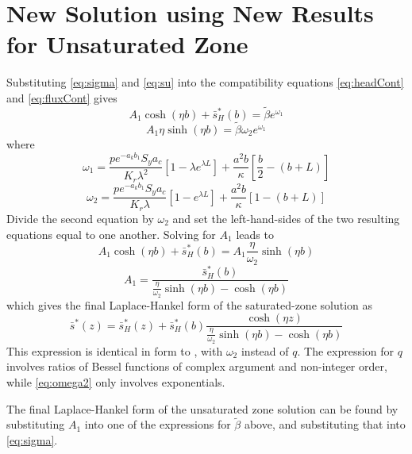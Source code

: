 \documentclass[11pt]{article}
\begin{document}
\section{New Solution using New Results for Unsaturated Zone}
Substituting \eqref{eq:sigma} and \eqref{eq:su} into the compatibility
equations \eqref{eq:headCont} and \eqref{eq:fluxCont} gives
$$  A_1 \cosh(\eta b) + \bar{s}_H^{\ast}(b) = \tilde{\beta}e^{\omega_1}$$
$$ A_1 \eta  \sinh(\eta b)  = \tilde{\beta} \omega_2 e^{\omega_1}$$
where 
$$ \omega_1 = \frac{p e^{-a_k b_1} S_y a_c} {K_r \lambda^2} \left[ 1  - \lambda e^{\lambda L} \right] + \frac{a^2 b}{\kappa}\left[\frac{b}{2} - \left( b+L\right) \right]$$
\begin{equation}
  \label{eq:omega2}
  \omega_2 = \frac{p e^{-a_k b_1} S_y a_c} {K_r \lambda} \left[ 1  -  e^{\lambda L} \right] + \frac{a^2 b}{\kappa}\left[1 - \left( b+L\right) \right]
\end{equation}
Divide the second equation by $\omega_2$ and set the left-hand-sides of the two resulting equations equal to one another.  Solving for $A_1$ leads to
$$A_1 \cosh(\eta b) + \bar{s}_H^{\ast}(b) = A_1 \frac{\eta}{\omega_2}  \sinh(\eta b) $$
$$ A_1 = \frac{\bar{s}_H^{\ast}(b)}{\frac{\eta}{\omega_2}  \sinh(\eta b) - \cosh(\eta b)}$$
which gives the final Laplace-Hankel form of the saturated-zone solution as
$$ \bar{s}^{\ast}(z)  = \bar{s}_H^{\ast}(z) + \bar{s}_H^{\ast}(b) \frac{\cosh(\eta z)}{\frac{\eta}{\omega_2}  \sinh(\eta b) - \cosh(\eta b)}$$ 
This expression is identical in form to \cite[eqn.\ C17]{mishra10}, with $\omega_2$ instead of $q$.  The expression for $q$ \cite[eqn.\ D13]{mishra10} involves ratios of Bessel functions of complex argument and non-integer order, while \eqref{eq:omega2} only involves exponentials.

The final Laplace-Hankel form of the unsaturated zone solution can be found by substituting $A_1$ into one of the expressions for $\tilde\beta$ above, and substituting that into \eqref{eq:sigma}.


\end{document}
